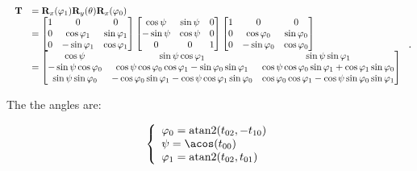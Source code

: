     \begin{equation}
        \scalebox{0.85}{
            $ \begin{array}{ll}
                \mathbf{T}
                &= \mathbf{R}_{x}(\varphi_1)\mathbf{R}_{y}(\theta)\mathbf{R}_{x}(\varphi_0) \\
                &=
                \begin{bmatrix}
                    1 & 0 & 0 \\
                    0 & \cos \varphi_1 & \sin \varphi_1 \\
                    0 & -\sin \varphi_1 & \cos \varphi_1
                \end{bmatrix}
                \begin{bmatrix}
                    \cos \psi & \sin \psi & 0 \\
                    -\sin \psi & \cos \psi & 0 \\
                    0 & 0 & 1
                \end{bmatrix}
                \begin{bmatrix}
                    1 & 0 & 0 \\
                    0 & \cos \varphi_0 & \sin \varphi_0 \\
                    0 & -\sin \varphi_0 & \cos \varphi_0
                \end{bmatrix} \\
                &=
                \begin{bmatrix}
                    \cos \psi
                    &  \sin \psi \cos \varphi_1
                    & \sin \psi \sin \varphi_1 \\
                    -\sin \psi \cos \varphi_0
                    & \cos \psi \cos \varphi_0 \cos \varphi_1 - \sin \varphi_0 \sin \varphi_1
                    & \cos \psi \cos \varphi_0 \sin \varphi_1 + \cos \varphi_1 \sin \varphi_0 \\
                    \sin \psi \sin \varphi_0
                    & -\cos \varphi_0 \sin \varphi_1 - \cos \psi \cos \varphi_1 \sin \varphi_0
                    & \cos \varphi_0 \cos \varphi_1 - \cos \psi \sin \varphi_0 \sin \varphi_1
                \end{bmatrix}
            \end{array} $
        }
    .\end{equation}

    The the angles are:

    \begin{equation}
        \left\{ \begin{array}{l}
            \varphi_0 = \atantwo(t_{02}, -t_{10}) \\
            \psi = \acos(t_{00}) \\
            \varphi_1 = \atantwo(t_{02}, t_{01})
        \end{array} \right.
    \end{equation}

